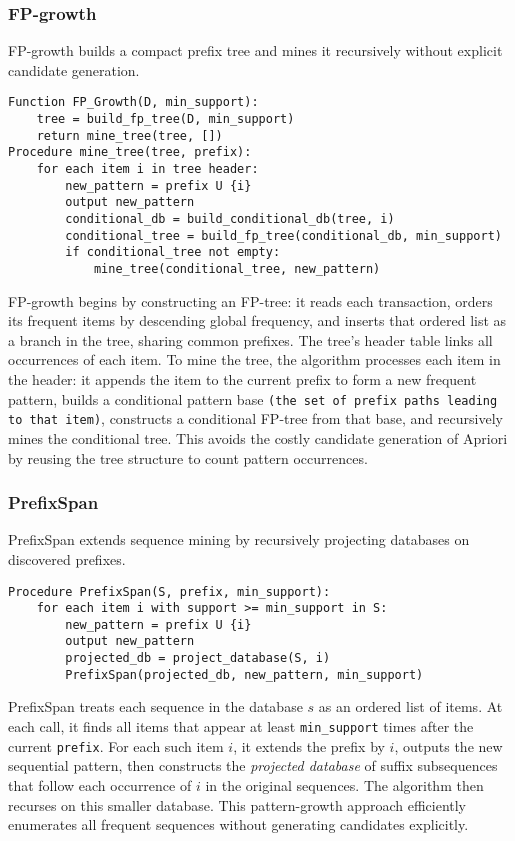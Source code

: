 \documentclass{article}
\begin{document}
\subsubsection{FP-growth}

FP-growth \cite{han2000mining} builds a compact prefix tree and mines it recursively without explicit candidate generation.

\begin{verbatim}
Function FP_Growth(D, min_support):
    tree = build_fp_tree(D, min_support)
    return mine_tree(tree, [])
Procedure mine_tree(tree, prefix):
    for each item i in tree header:
        new_pattern = prefix U {i}
        output new_pattern
        conditional_db = build_conditional_db(tree, i)
        conditional_tree = build_fp_tree(conditional_db, min_support)
        if conditional_tree not empty:
            mine_tree(conditional_tree, new_pattern)
\end{verbatim}

FP-growth begins by constructing an FP-tree: it reads each transaction, orders its frequent items by descending global frequency, and inserts that ordered list as a branch in the tree, sharing common prefixes.  The tree's header table links all occurrences of each item.  To mine the tree, the algorithm processes each item in the header: it appends the item to the current prefix to form a new frequent pattern, builds a conditional pattern base \texttt{(the set of prefix paths leading to that item)}, constructs a conditional FP-tree from that base, and recursively mines the conditional tree.  This avoids the costly candidate generation of Apriori by reusing the tree structure to count pattern occurrences.

\subsubsection{PrefixSpan}

PrefixSpan \cite{pei2001prefixspan} extends sequence mining by recursively projecting databases on discovered prefixes.

\begin{verbatim}
Procedure PrefixSpan(S, prefix, min_support):
    for each item i with support >= min_support in S:
        new_pattern = prefix U {i}
        output new_pattern
        projected_db = project_database(S, i)
        PrefixSpan(projected_db, new_pattern, min_support)
\end{verbatim}

PrefixSpan treats each sequence in the database $s$ as an ordered list of items.  At each call, it finds all items that appear at least \texttt{min\_support} times after the current \texttt{prefix}.  For each such item $i$, it extends the prefix by $i$, outputs the new sequential pattern, then constructs the \emph{projected database} of suffix subsequences that follow each occurrence of $i$ in the original sequences.  The algorithm then recurses on this smaller database.  This pattern-growth approach efficiently enumerates all frequent sequences without generating candidates explicitly.
\end{document}
